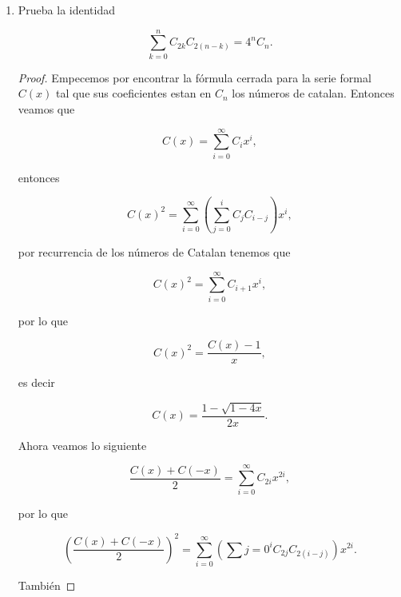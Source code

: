 \documentclass[letterpaper]{article}
\newcommand{\pars}[1]{\left( #1 \right) }
\newcommand{\1}{\mathbbm{1}}
\begin{document}
\begin{enumerate}
		\begin{proof}
			Recordemos que

			\[(1+x)^{\alpha} = \sum_{i=0}^{\infty} \binom{\alpha}{i} x^i.\]

			Ahora por un lado tenemos que

			\[(1+x)^{\alpha}(1+x)^{\beta} = \pars{\sum_{i=0}^{\infty} \binom{\alpha}{i} x^i}\pars{\sum_{i=0}^{\infty} \binom{\beta}{i} x^i} = \sum_{i=0}^{\infty} \pars{\sum_{j=0}^{i} \binom{\alpha}{i}\binom{\beta}{i-j}} x^i,\]

			y por el otro

			\[(1+x)^{\alpha + \beta} = \sum_{i=0}^{\infty} \binom{\alpha + \beta}{i} x^i.\]

			Por Chu Vandermonde tenemos que los coeficiente de estas series formales son iguales y por lo tanto

			\[(1+y)^\alpha(1+y)^\beta=(1+y)^{\alpha+\beta}.\]
		\end{proof}

		\item Prueba la identidad
		
		\[\sum^n_{k=0}C_{2k}C_{2(n- k)} = 4^nC_n.\]

		\begin{proof}
			Empecemos por encontrar la fórmula cerrada para la serie formal $C(x)$ tal que sus coeficientes estan en ${C_n}$ los números de catalan. Entonces veamos que

			\[C(x) = \sum_{i=0}^\infty C_ix^i,\]

			entonces

			\[C(x)^2 = \sum_{i=0}^\infty \pars{\sum_{j=0}^i C_jC_{i-j}}x^i,\]

			por recurrencia de los números de Catalan tenemos que

			\[C(x)^2 = \sum_{i=0}^\infty C_{i+1}x^i,\]

			por lo que

			\[C(x)^2 = \frac{C(x)-1}{x},\]

			es decir

			\[C(x) = \frac{1-\sqrt{1-4x}}{2x}.\]

			Ahora veamos lo siguiente

			\[\frac{C(x)+C(-x)}{2} = \sum_{i=0}^\infty C_{2i}x^{2i},\]

			por lo que

			\[\pars{\frac{C(x)+C(-x)}{2}}^2 = \sum_{i=0}^\infty \pars{\sum{j=0}^{i}C_{2j}C_{2(i-j)}}x^{2i}.\]

			También


\end{proof}
\end{enumerate}
\end{document}
